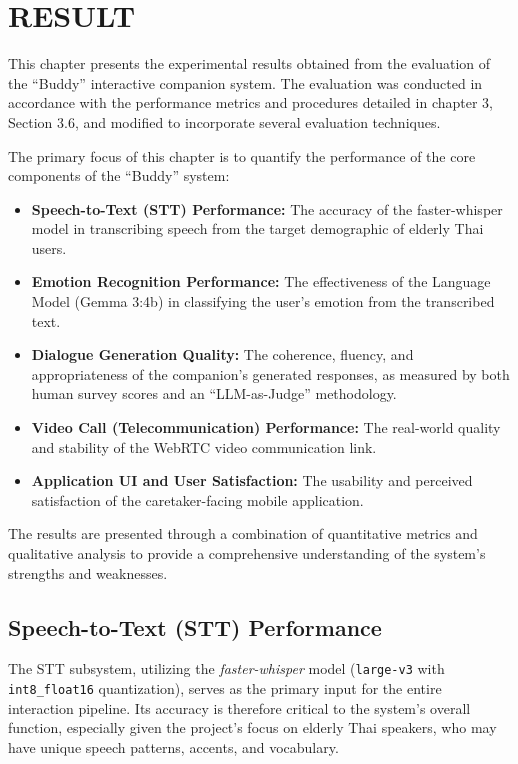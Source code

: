 \chapter{RESULT}
\hspace{\parindent}
This chapter presents the experimental results obtained from the evaluation of the “Buddy” interactive companion system. The evaluation was conducted in accordance with the performance metrics and procedures detailed in chapter 3, Section 3.6, and modified to incorporate several evaluation techniques.
\par
The primary focus of this chapter is to quantify the performance of the core components of the “Buddy” system:
\begin{itemize}
	\item \textbf{Speech-to-Text (STT) Performance:} The accuracy of the faster-whisper model in transcribing speech from the target demographic of elderly Thai users.
	\item \textbf{Emotion Recognition Performance:} The effectiveness of the Language Model (Gemma 3:4b) in classifying the user's emotion from the transcribed text.
	\item \textbf{Dialogue Generation Quality:} The coherence, fluency, and appropriateness of the companion’s generated responses, as measured by both human survey scores and an “LLM-as-Judge” methodology.
	\item \textbf{Video Call (Telecommunication) Performance:} The real-world quality and stability of the WebRTC video communication link.
	\item \textbf{Application UI and User Satisfaction:} The usability and perceived satisfaction of the caretaker-facing mobile application.
\end{itemize}
\par
The results are presented through a combination of quantitative metrics and qualitative analysis to provide a comprehensive understanding of the system’s strengths and weaknesses.

\section{Speech-to-Text (STT) Performance}
\noindent\hspace{2.2em}The STT subsystem, utilizing the \textit{faster-whisper} model (\texttt{large-v3} with \texttt{int8\_float16} quantization), serves as the primary input for the entire interaction pipeline. Its accuracy is therefore critical to the system's overall function, especially given the project's focus on elderly Thai speakers, who may have unique speech patterns, accents, and vocabulary.

